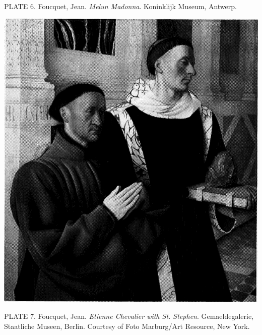 PLATE 6. Foucquet, Jean. \emph{Melun Madonna}. Koninklijk Museum,
Antwerp.

\protect\hypertarget{20_ILLUSTRATIONS_FOLLOW_PAGE.xhtmlux5cux23id_7}{}{}\includegraphics{include/html/images/327_1.png}

PLATE 7. Foucquet, Jean. \emph{Etienne Chevalier with St. Stephen}.
Gemaeldegalerie, Staatliche Museen, Berlin. Courtesy of Foto Marburg/Art
Resource, New York.

